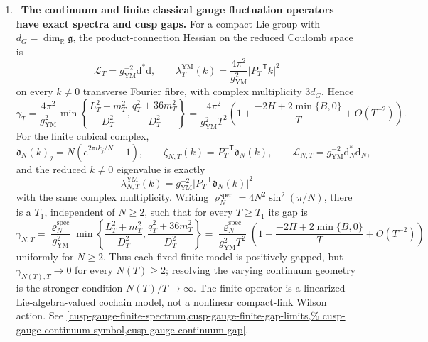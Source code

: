 \begin{enumerate}[leftmargin=1.8em,itemsep=.65em]
\item \Verified\ \textbf{The continuum and finite classical gauge
fluctuation operators have exact spectra and cusp gaps.}
For a compact Lie group with \(d_G=\dim_{\mathbb R}\mathfrak g\), the
product-connection Hessian on the reduced Coulomb space is
\[
 \mathcal L_T=g_{\mathrm{YM}}^{-2}\mathrm d^*\mathrm d,\qquad
 \lambda_T^{\mathrm{YM}}(k)
 =\frac{4\pi^2}{g_{\mathrm{YM}}^2}
  \lvert P_T^{-\mathsf T}k\rvert^2
\]
on every \(k\ne0\) transverse Fourier fibre, with complex multiplicity
\(3d_G\).  Hence
\[
 \gamma_T=\frac{4\pi^2}{g_{\mathrm{YM}}^2}
 \min\left\{\frac{L_T^2+m_T^2}{D_T^2},
                  \frac{q_T^2+36m_T^2}{D_T^2}\right\}
 =\frac{4\pi^2}{g_{\mathrm{YM}}^2T^2}
 \left(1+\frac{-2H+2\min\{B,0\}}T+O(T^{-2})\right).
\]
For the finite cubical complex,
\[
 \mathfrak d_N(k)_j=N(e^{2\pi i k_j/N}-1),\qquad
 \zeta_{N,T}(k)=P_T^{-\mathsf T}\mathfrak d_N(k),\qquad
 \mathcal L_{N,T}=g_{\mathrm{YM}}^{-2}\mathrm d_N^*\mathrm d_N,
\]
and the reduced \(k\ne0\) eigenvalue is exactly
\[
 \lambda_{N,T}^{\mathrm{YM}}(k)
 =g_{\mathrm{YM}}^{-2}\lvert P_T^{-\mathsf T}\mathfrak d_N(k)\rvert^2
\]
with the same complex multiplicity.  Writing
\(\varrho_N^{\mathrm{spec}}=4N^2\sin^2(\pi/N)\), there is a \(T_1\), independent of
\(N\ge2\), such that for every \(T\ge T_1\) its gap is
\[
 \gamma_{N,T}=\frac{\varrho_N^{\mathrm{spec}}}{g_{\mathrm{YM}}^2}
 \min\left\{\frac{L_T^2+m_T^2}{D_T^2},
                  \frac{q_T^2+36m_T^2}{D_T^2}\right\}
 =\frac{\varrho_N^{\mathrm{spec}}}{g_{\mathrm{YM}}^2T^2}
 \left(1+\frac{-2H+2\min\{B,0\}}T+O(T^{-2})\right)
\]
uniformly for \(N\ge2\).  Thus each fixed finite model is positively
gapped, but \(\gamma_{N(T),T}\to0\) for every \(N(T)\ge2\); resolving
the varying continuum geometry is the stronger condition
\(N(T)/T\to\infty\).  The finite operator is a linearized
Lie-algebra-valued cochain model, not a nonlinear compact-link Wilson
action.  See
 \cref{cusp-gauge-finite-spectrum,cusp-gauge-finite-gap-limits,%
 cusp-gauge-continuum-symbol,cusp-gauge-continuum-gap}.


\end{enumerate}
